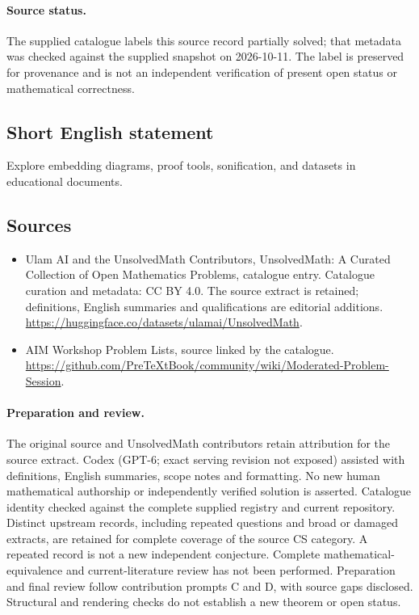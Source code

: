 \documentclass[11pt]{article}
\begin{document}
\paragraph{Source status.}
The supplied catalogue labels this source record partially solved; that metadata was checked against the supplied snapshot on 2026-10-11. The label is preserved for provenance and is not an independent verification of present open status or mathematical correctness.
\subsection{Short English statement}
Explore embedding diagrams, proof tools, sonification, and datasets in educational documents.
\subsection{Sources}
\begin{itemize}
\item[\hypertarget{source:statement:1}{S1}] Ulam AI and the UnsolvedMath Contributors, UnsolvedMath: A Curated Collection of Open Mathematics Problems, catalogue entry. Catalogue curation and metadata: CC BY 4.0. The source extract is retained; definitions, English summaries and qualifications are editorial additions.
\url{https://huggingface.co/datasets/ulamai/UnsolvedMath}.
\item[\hypertarget{source:statement:2}{S2}] AIM Workshop Problem Lists, source linked by the catalogue.
\url{https://github.com/PreTeXtBook/community/wiki/Moderated-Problem-Session}.
\end{itemize}
\paragraph{Preparation and review.}
The original source and UnsolvedMath contributors retain attribution for the source extract. Codex (GPT-6; exact serving revision not exposed) assisted with definitions, English summaries, scope notes and formatting. No new human mathematical authorship or independently verified solution is asserted. Catalogue identity checked against the complete supplied registry and current repository. Distinct upstream records, including repeated questions and broad or damaged extracts, are retained for complete coverage of the source CS category. A repeated record is not a new independent conjecture. Complete mathematical-equivalence and current-literature review has not been performed. Preparation and final review follow contribution prompts C and D, with source gaps disclosed. Structural and rendering checks do not establish a new theorem or open status.
\label{end:statement}
\end{document}
